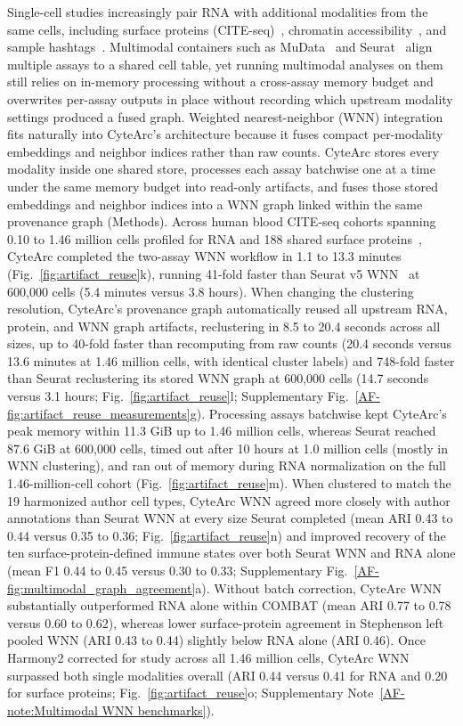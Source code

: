 \documentclass[11pt]{article}
\newcommand{\sref}[1]{\ref*{AF-#1}}
\begin{document}
Single-cell studies increasingly pair RNA with additional modalities from the same cells, including surface proteins (CITE-seq)~\cite{stoeckius2017simultaneous}, chromatin accessibility~\cite{swanson2021}, and sample hashtags~\cite{stoeckius2018}. Multimodal containers such as MuData~\cite{bredikhin2022muon} and Seurat~\cite{hao2021} align multiple assays to a shared cell table, yet running multimodal analyses on them still relies on in-memory processing without a cross-assay memory budget and overwrites per-assay outputs in place without recording which upstream modality settings produced a fused graph. Weighted nearest-neighbor (WNN) integration~\cite{hao2021} fits naturally into CyteArc's architecture because it fuses compact per-modality embeddings and neighbor indices rather than raw counts. CyteArc stores every modality inside one shared store, processes each assay batchwise one at a time under the same memory budget into read-only artifacts, and fuses those stored embeddings and neighbor indices into a WNN graph linked within the same provenance graph (Methods). Across human blood CITE-seq cohorts spanning 0.10 to 1.46 million cells profiled for RNA and 188 shared surface proteins~\cite{combat2022blood,stephenson2021singlecell}, CyteArc completed the two-assay WNN workflow in 1.1 to 13.3 minutes (Fig.~\ref{fig:artifact_reuse}k), running 41-fold faster than Seurat v5 WNN~\cite{hao2024seurat} at 600,000 cells (5.4 minutes versus 3.8 hours). When changing the clustering resolution, CyteArc's provenance graph automatically reused all upstream RNA, protein, and WNN graph artifacts, reclustering in 8.5 to 20.4 seconds across all sizes, up to 40-fold faster than recomputing from raw counts (20.4 seconds versus 13.6 minutes at 1.46 million cells, with identical cluster labels) and 748-fold faster than Seurat reclustering its stored WNN graph at 600,000 cells (14.7 seconds versus 3.1 hours; Fig.~\ref{fig:artifact_reuse}l; Supplementary Fig.~\sref{fig:artifact_reuse_measurements}g). Processing assays batchwise kept CyteArc's peak memory within 11.3 GiB up to 1.46 million cells, whereas Seurat reached 87.6 GiB at 600,000 cells, timed out after 10 hours at 1.0 million cells (mostly in WNN clustering), and ran out of memory during RNA normalization on the full 1.46-million-cell cohort (Fig.~\ref{fig:artifact_reuse}m). When clustered to match the 19 harmonized author cell types, CyteArc WNN agreed more closely with author annotations than Seurat WNN at every size Seurat completed (mean ARI 0.43 to 0.44 versus 0.35 to 0.36; Fig.~\ref{fig:artifact_reuse}n) and improved recovery of the ten surface-protein-defined immune states over both Seurat WNN and RNA alone (mean F1 0.44 to 0.45 versus 0.30 to 0.33; Supplementary Fig.~\sref{fig:multimodal_graph_agreement}a). Without batch correction, CyteArc WNN substantially outperformed RNA alone within COMBAT (mean ARI 0.77 to 0.78 versus 0.60 to 0.62), whereas lower surface-protein agreement in Stephenson left pooled WNN (ARI 0.43 to 0.44) slightly below RNA alone (ARI 0.46). Once Harmony2 corrected for study across all 1.46 million cells, CyteArc WNN surpassed both single modalities overall (ARI 0.44 versus 0.41 for RNA and 0.20 for surface proteins; Fig.~\ref{fig:artifact_reuse}o; Supplementary Note~\sref{note:Multimodal WNN benchmarks}).
\end{document}

